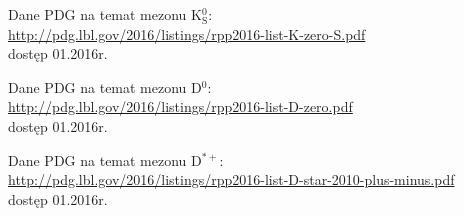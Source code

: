 \begin{thebibliography}{9}

  Dane PDG na temat mezonu K$^0_\text{S}$:\\
  \url{http://pdg.lbl.gov/2016/listings/rpp2016-list-K-zero-S.pdf}\\
  dostęp 01.2016r.
  
  Dane PDG na temat mezonu D$^0$:\\
  \url{http://pdg.lbl.gov/2016/listings/rpp2016-list-D-zero.pdf}\\
  dostęp 01.2016r.

	Dane PDG na temat mezonu D$^{*+}$:\\
  \url{http://pdg.lbl.gov/2016/listings/rpp2016-list-D-star-2010-plus-minus.pdf}\\
  dostęp 01.2016r.

\end{thebibliography}

